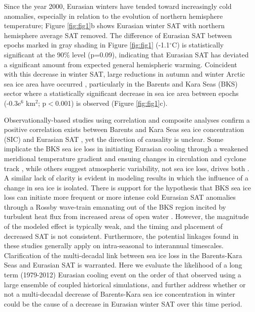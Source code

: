 \documentclass{nature}
\begin{document}
Since the year 2000, Eurasian winters have tended toward increasingly cold anomalies, especially in relation to the evolution of northern hemisphere temperature; Figure \ref{fig:fig1}b shows Eurasian winter SAT with northern hemisphere average SAT removed. The difference of Eurasian SAT between epochs marked in gray shading in Figure \ref{fig:fig1} (-1.1$^\circ$C) is statistically significant at the 90\% level (p=0.09), indicating that Eurasian SAT has deviated a significant amount from expected general hemispheric warming. Coincident with this decrease in winter SAT, large reductions in autumn and winter Arctic sea ice area have occurred \cite{stroeve12}, particularly in the Barents and Kara Seas (BKS) sector where a statistically significant decrease in sea ice area between epochs (-0.3e$^6$ km$^2$; p$<$0.001) is observed (Figure \ref{fig:fig1}c). 

Observationally-based studies using correlation and composite analyses confirm a positive correlation exists between Barents and Kara Seas sea ice concentration (SIC) and Eurasian SAT \cite{inoue12,outten12,sorokina15}, yet the direction of causality is unclear. Some implicate the BKS sea ice loss in initiating Eurasian cooling through a weakened meridional temperature gradient and ensuing changes in circulation and cyclone track \cite{inoue12,outten12}, while others suggest atmospheric variability, not sea ice loss, drives both \cite{sorokina15}. A similar lack of clarity is evident in modeling results in which the influence of a change in sea ice is isolated. There is support for the hypothesis that BKS sea ice loss can initiate more frequent or more intense cold Eurasian SAT anomalies through a Rossby wave-train emanating out of the BKS region incited by turbulent heat flux from increased areas of open water \cite{honda09,petoukhov10,mori14,kim14,peings14,gerber14}. However, the magnitude of the modeled effect is typically weak, and the timing and placement of decreased SAT is not consistent. Furthermore, the potential linkages found in these studies generally apply on intra-seasonal to interannual timescales. Clarification of the multi-decadal link between sea ice loss in the Barents-Kara Seas and Eurasian SAT is warranted. Here we evaluate the likelihood of a long term (1979-2012) Eurasian cooling event on the order of that observed using a large ensemble of coupled historical simulations, and further address whether or not a multi-decadal decrease of Barents-Kara sea ice concentration in winter could be the cause of a decrease in Eurasian winter SAT over this time period. 
\end{document}
